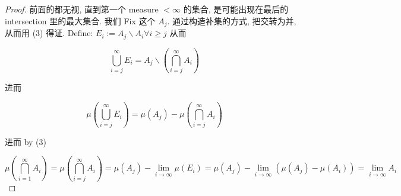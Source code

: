\begin{theorem}{}
\begin{enumerate}
\begin{proof}
  前面的都无视, 直到第一个 measure \(< \infty\) 的集合, 是可能出现在最后的 intersection 里的最大集合. 我们 Fix 这个 \(A_{j}\). 通过构造补集的方式, 把交转为并, 从而用 (3) 得证. Define: \(E_{i} := A_{j}\backslash A_{i}\forall i \geq j\) 从而

  \[\bigcup\limits_{i = j}^{\infty}E_{i} = A_{j}\backslash(\bigcap\limits_{i = j}^{\infty}A_{i})\]

  进而

  \[\mu(\bigcup\limits_{i = j}^{\infty}E_{i}) = \mu(A_{j}) - \mu(\bigcap\limits_{i = j}^{\infty}A_{i})\]

  进而 by (3)

  \[\mu(\bigcap\limits_{i = 1}^{\infty}A_{i}) = \mu(\bigcap\limits_{i = j}^{\infty}A_{i}) = \mu(A_{j}) - \lim\limits_{i\rightarrow\infty}\mu(E_{i}) = \mu(A_{j}) - \lim\limits_{i\rightarrow\infty}(\mu(A_{j}) - \mu(A_{i})) = \lim\limits_{i\rightarrow\infty}A_{i}\]

  \end{proof}
\end{enumerate}

\end{theorem}

